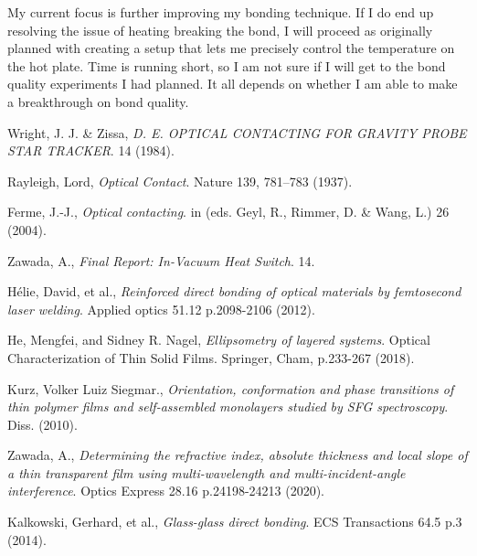 \documentclass[colorlinks=true,pdfstartview=FitV,linkcolor=blue,
            citecolor=red,urlcolor=magenta]{ligodoc}
\begin{document}
My current focus is further improving my bonding technique. If I do end up resolving the issue of heating breaking the bond, I will proceed as originally planned with creating a setup that lets me precisely control the temperature on the hot plate. Time is running short, so I am not sure if I will get to the bond quality experiments I had planned. It all depends on whether I am able to make a breakthrough on bond quality.

\begin{thebibliography}{9}
	  Wright, J. J. & Zissa,
	  \emph{D. E. OPTICAL CONTACTING FOR GRAVITY PROBE STAR TRACKER}.
	  14 (1984).    
      
	  Rayleigh, Lord,
	  \emph{Optical Contact}.
	  Nature 139, 781–783 (1937).
	  
	  Ferme, J.-J.,
	  \emph{Optical contacting}.
	  in (eds. Geyl, R., Rimmer, D. & Wang, L.) 26 (2004).
	 
	  Zawada, A.,
	  \emph{Final Report: In-Vacuum Heat Switch}.
	  14.
    
	  Hélie, David, et al.,
	  \emph{Reinforced direct bonding of optical materials by femtosecond laser welding}.
	  Applied optics 51.12 p.2098-2106 (2012).    

	  He, Mengfei, and Sidney R. Nagel,
	  \emph{Ellipsometry of layered systems}.
	  Optical Characterization of Thin Solid Films. Springer, Cham, p.233-267 (2018).

	  Kurz, Volker Luiz Siegmar.,
	  \emph{Orientation, conformation and phase transitions of thin polymer films and self-assembled monolayers studied by SFG spectroscopy}.
	  Diss. (2010).

	  Zawada, A.,
	  \emph{Determining the refractive index, absolute thickness and local slope of a thin transparent film using multi-wavelength and multi-incident-angle interference}.
	  Optics Express 28.16 p.24198-24213 (2020).
  
	  Kalkowski, Gerhard, et al.,
	  \emph{Glass-glass direct bonding}.
	  ECS Transactions 64.5 p.3 (2014).
 
\end{thebibliography} %
\end{document}
